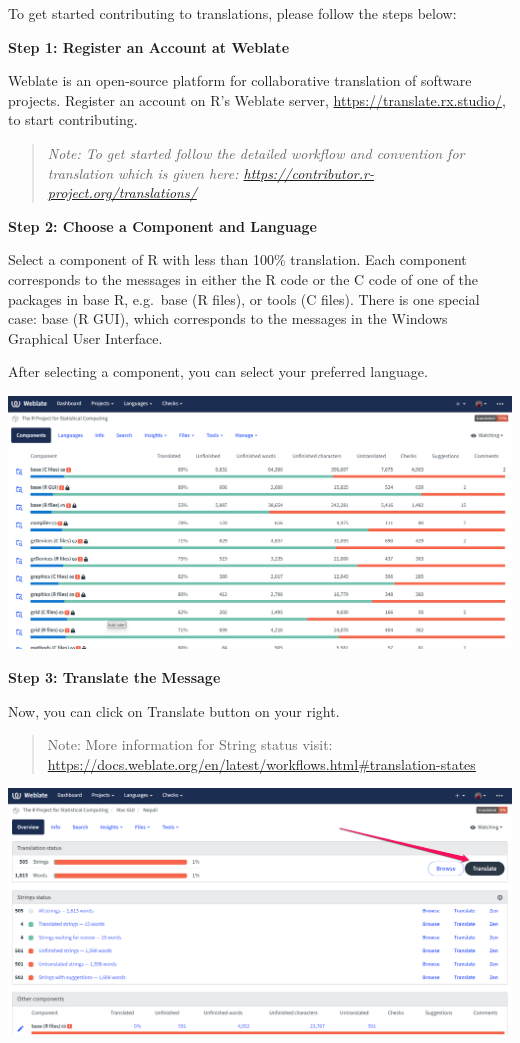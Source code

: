 \documentclass[
]{book}
\begin{document}
To get started contributing to translations, please follow the steps
below:

\textbf{Step 1: Register an Account at Weblate}

Weblate is an open-source platform for collaborative translation of
software projects. Register an account on R's Weblate server,
\url{https://translate.rx.studio/}, to start contributing.

\begin{quote}
\emph{Note: To get started follow the detailed workflow and convention for
translation which is given here:
\url{https://contributor.r-project.org/translations/}}
\end{quote}

\textbf{Step 2: Choose a Component and Language}

Select a component of R with less than 100\% translation. Each component
corresponds to the messages in either the R code or the C code of one of
the packages in base R, e.g.~base (R files), or tools (C files). There
is one special case: base (R GUI), which corresponds to the messages in
the Windows Graphical User Interface.

After selecting a component, you can select your preferred language.

\includegraphics{img/translate_component.png}

\textbf{Step 3: Translate the Message}

Now, you can click on Translate button on your right.

\begin{quote}
Note: More information for String status visit:
\url{https://docs.weblate.org/en/latest/workflows.html\#translation-states}
\end{quote}

\includegraphics{img/translate_button.png}
\end{document}
